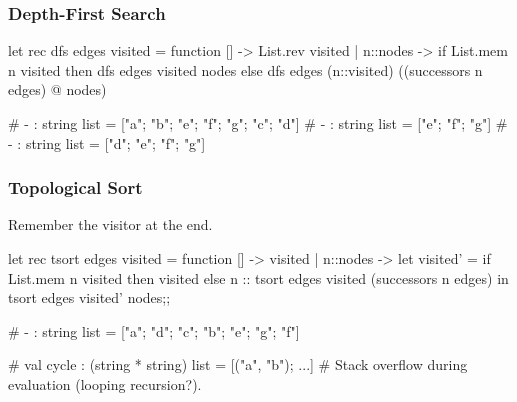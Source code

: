 \documentclass{plt}
\begin{document}
\begin{frame}[fragile]
  \frametitle{Depth-First Search}

\graph

\begin{ocaml}
let rec dfs edges visited = function
  []       -> List.rev visited
| n::nodes ->
  if List.mem n visited then
    dfs edges visited nodes
  else
    dfs edges (n::visited) ((successors n edges) @ nodes)
\end{ocaml}

\begin{interactive}
# 
- : string list = ["a"; "b"; "e"; "f"; "g"; "c"; "d"]
# 
- : string list = ["e"; "f"; "g"]
# 
- : string list = ["d"; "e"; "f"; "g"]
\end{interactive}

\end{frame}

\begin{frame}[fragile]
  \frametitle{Topological Sort}

\graph

Remember the visitor at the end.

\begin{ocaml}
let rec tsort edges visited = function
  []       -> visited
| n::nodes ->
  let visited' = if List.mem n visited then visited
                 else n :: tsort edges visited (successors n edges)
  in tsort edges visited' nodes;;
\end{ocaml}

\begin{interactive}
# 
- : string list = ["a"; "d"; "c"; "b"; "e"; "g"; "f"]

# 
val cycle : (string * string) list = [("a", "b"); ...]
# 
Stack overflow during evaluation (looping recursion?).
\end{interactive}

\end{frame}
\end{document}
